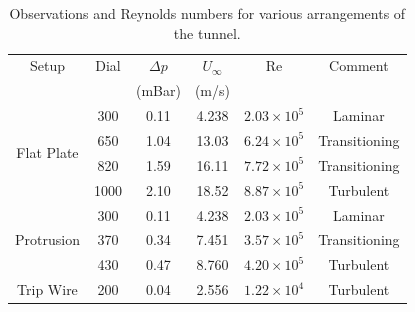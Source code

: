 \documentclass{article}
\begin{document}
\begin{table}[h]
    \centering
    \begin{tabular}{cccccc}
        \hline
        Setup & Dial & $\Delta p$ & $U_{\infty}$ & Re & Comment \\
        & & (mBar) & (m/s) & & \\
        \hline
        \hline
        \multirow{4}{*}{Flat Plate} & 300 & 0.11 & 4.238 & $2.03 \times 10^5$ & Laminar \\
        & 650 & 1.04 &  13.03 & $6.24 \times 10^5$ & Transitioning \\
        & 820 & 1.59 & 16.11 & $7.72 \times 10^5$ & Transitioning \\
        & 1000 & 2.10 & 18.52 & $8.87 \times 10^5$ & Turbulent \\
        \hline
        \hline
        \multirow{3}{*}{Protrusion} & 300 & 0.11 & 4.238 & $2.03 \times 10^5$ & Laminar \\
        & 370 & 0.34 & 7.451  & $3.57 \times 10^5$ & Transitioning \\
        & 430 & 0.47 & 8.760  & $4.20 \times 10^5$ & Turbulent \\
        \hline
        \hline
        \multirow{1}{*}{Trip Wire} & 200 & 0.04 & 2.556 & $1.22 \times 10^4$ & Turbulent \\
        \hline
    \end{tabular}
    \caption{Observations and Reynolds numbers for various arrangements of the tunnel.}
    \label{tab:observations}
\end{table}
\end{document}
